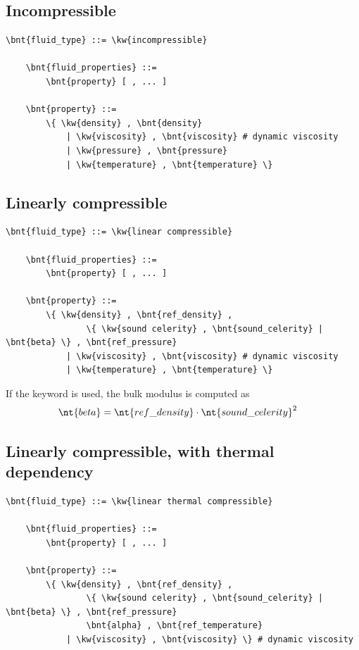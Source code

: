 \subsection{Incompressible}
\begin{Verbatim}[commandchars=\\\{\}]
    \bnt{fluid_type} ::= \kw{incompressible}

    \bnt{fluid_properties} ::=
        \bnt{property} [ , ... ]

    \bnt{property} ::=
        \{ \kw{density} , \bnt{density}
            | \kw{viscosity} , \bnt{viscosity} # dynamic viscosity
            | \kw{pressure} , \bnt{pressure}
            | \kw{temperature} , \bnt{temperature} \}
\end{Verbatim}

\subsection{Linearly compressible}
\begin{Verbatim}[commandchars=\\\{\}]
    \bnt{fluid_type} ::= \kw{linear compressible}

    \bnt{fluid_properties} ::=
        \bnt{property} [ , ... ]

    \bnt{property} ::=
        \{ \kw{density} , \bnt{ref_density} ,
                \{ \kw{sound celerity} , \bnt{sound_celerity} | \bnt{beta} \} , \bnt{ref_pressure}
            | \kw{viscosity} , \bnt{viscosity} # dynamic viscosity
            | \kw{temperature} , \bnt{temperature} \}
\end{Verbatim}
If the keyword  is used, the bulk modulus 
is computed as
\begin{align}
	\nt{beta}
	&=
	\nt{ref\_density} \cdot \nt{sound\_celerity}^2
\end{align}

\subsection{Linearly compressible, with thermal dependency}
\begin{Verbatim}[commandchars=\\\{\}]
    \bnt{fluid_type} ::= \kw{linear thermal compressible}

    \bnt{fluid_properties} ::= 
        \bnt{property} [ , ... ]

    \bnt{property} ::=
        \{ \kw{density} , \bnt{ref_density} ,
                \{ \kw{sound celerity} , \bnt{sound_celerity} | \bnt{beta} \} , \bnt{ref_pressure}
                \bnt{alpha} , \bnt{ref_temperature}
            | \kw{viscosity} , \bnt{viscosity} \} # dynamic viscosity
\end{Verbatim}

